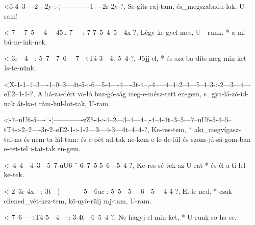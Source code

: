   {<ô-4--3----2---2y-:-¡-------------1----2r-2y-?,}
  {   Se-gíts raj-tam, és_megszabadu-lok, U--ram!}

  {<-7----7--5----4----45u-7-----:-7-7--5--4--5---4x-?,}
  {  Légy ke-gyel-mes, U---runk, * a mi bű-ne-ink-nek.}

  {<-3r---4---:-5--7---7--6----7---tT4-3---4t-5--4-?,}
  {  Jöjj el, * és sza-ba-díts meg min-ket Is-te-nünk.}




  {<X-1-1--1--3----1--0--3---4t-5-:-6---5-4----4----3t-4--,-4-----4--4--2--4---5--4--3-:-2---3---4---eE2--1-1-?,}
  {   A há-za-dért va-ló buz-gó-ság meg-e-mész-tett en-gem, s_gya-lá-zó-id-nak át-ka-i   rám-hul-lot-tak, U-ram. }

  {<-7--uU6-5----¨-¦-------------zZ5-4-:-4--2---3--4---4--,-4--4-4t--3--5---7--uU6-5-4--5--tT4-:-2--2----3r-2--eE2-1-:-1-2---3---4-3---4t--4--4-?,}
  {  Ke-res-tem, * aki_megvígasz-tal-na  és nem ta-lál-tam: és e-pét ad-tak ne-kem e-le-de-lül   és szom-jú-sá-gom-ban e-cet-tel i-tat-tak en-gem.}

  {<--4--4---4--3---5--7-uU6-¨-6--7--5-5--6---5--4-?,}
  {   Ke-res-sé-tek az U-rat * és él a ti lel-ke-tek.}



  {<-2--3r-4x---:-3t---¦-----------5---6uc-:-5--5---5----6---5----4-4-?,}
  {  El-le-ned, * csak ellened_vét-kez-tem,  kö-nyö-rülj raj-tam, U-ram.}

  {<-7--6-----tT4-5---4----:-3-4t---6--5--4-?,}
  {  Ne hagyj el  min-ket, * U-runk so-ha-se.}

